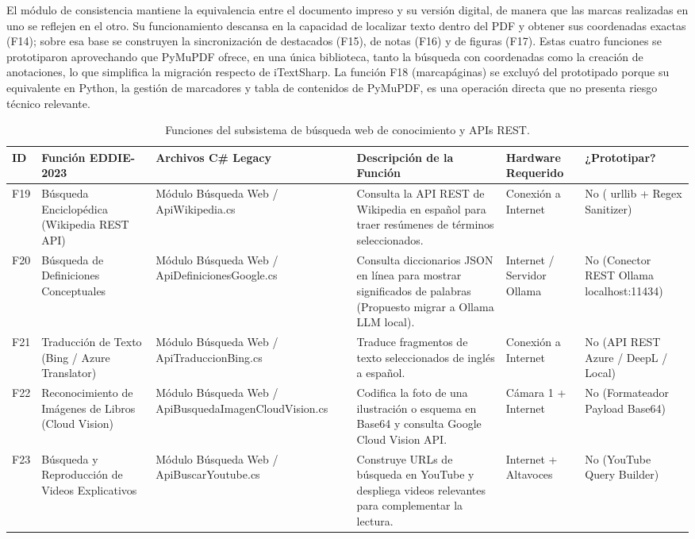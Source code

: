 El módulo de consistencia mantiene la equivalencia entre el documento impreso y su versión digital, de manera que las marcas realizadas en uno se reflejen en el otro. Su funcionamiento descansa en la capacidad de localizar texto dentro del PDF y obtener sus coordenadas exactas (F14); sobre esa base se construyen la sincronización de destacados (F15), de notas (F16) y de figuras (F17). Estas cuatro funciones se prototiparon aprovechando que PyMuPDF ofrece, en una única biblioteca, tanto la búsqueda con coordenadas como la creación de anotaciones, lo que simplifica la migración respecto de iTextSharp. La función F18 (marcapáginas) se excluyó del prototipado porque su equivalente en Python, la gestión de marcadores y tabla de contenidos de PyMuPDF, es una operación directa que no presenta riesgo técnico relevante.
 
\begin{table}[H]
    \centering
    \caption{Funciones del subsistema de búsqueda web de conocimiento y APIs REST.}
    \label{tab:func_busqueda_web}
    \begin{small}
    \begin{tabular}{L{0.6cm} L{2.2cm} L{2.2cm} L{4.1cm} L{1.6cm} L{1.8cm}}
        \toprule
        ID & Función EDDIE-2023 & Archivos C\# Legacy & Descripción de la Función & Hardware Requerido & ¿Prototipar? \\ \midrule
        F19 & Búsqueda Enciclopédica (Wikipedia REST API) & Módulo Búsqueda Web / ApiWikipedia.cs & Consulta la API REST de Wikipedia en español para traer resúmenes de términos seleccionados. & Conexión a Internet & No ( urllib + Regex Sanitizer) \\ \midrule
        F20 & Búsqueda de Definiciones Conceptuales & Módulo Búsqueda Web / ApiDefinicionesGoogle.cs & Consulta diccionarios JSON en línea para mostrar significados de palabras (Propuesto migrar a Ollama LLM local). & Internet / Servidor Ollama & No (Conector REST Ollama localhost:11434) \\ \midrule
        F21 & Traducción de Texto (Bing / Azure Translator) & Módulo Búsqueda Web / ApiTraduccionBing.cs & Traduce fragmentos de texto seleccionados de inglés a español. & Conexión a Internet & No (API REST Azure / DeepL / Local) \\ \midrule
        F22 & Reconocimiento de Imágenes de Libros (Cloud Vision) & Módulo Búsqueda Web / ApiBusquedaImagenCloudVision.cs & Codifica la foto de una ilustración o esquema en Base64 y consulta Google Cloud Vision API. & Cámara 1 + Internet & No (Formateador Payload Base64) \\ \midrule
        F23 & Búsqueda y Reproducción de Videos Explicativos & Módulo Búsqueda Web / ApiBuscarYoutube.cs & Construye URLs de búsqueda en YouTube y despliega videos relevantes para complementar la lectura. & Internet + Altavoces & No (YouTube Query Builder) \\ \bottomrule
    \end{tabular}
    \end{small}
\end{table}
 
